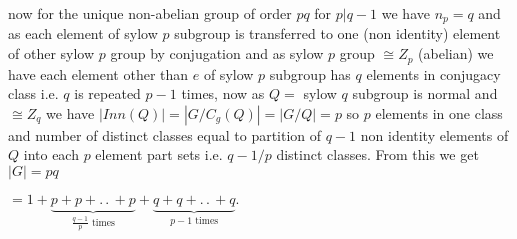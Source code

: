 \documentclass[11pt]{extarticle}
\newcommand{\w}[1]{\text{#1}}
\newcommand{\ck}{.\,.\,}
\newcommand{\tbx}[2][]{
	\begin{tcolorbox}[enhanced,breakable,size=small,colback=black!2!white,title={#1},arc is angular, arc=1.5mm,drop fuzzy shadow]
		#2
	\end{tcolorbox}
}
\begin{document}
\begin{multicols}{2}
	\tbx[\small Class equation of non abelian $pq $ order group]{ now for the unique non-abelian group of order $ pq $ for $ p|q-1 $ we have $ n_p=q$ and as each element of sylow $ p $ subgroup is transferred to one (non identity) element of other sylow $ p $ group by conjugation and as sylow $ p $ group $ \cong Z_p$ (abelian) we have each element other than $ e $ of sylow $ p $ subgroup has  $ q $ elements in conjugacy class i.e. $ q $ is repeated $ p-1 $ times, now as  $ Q= $ sylow $ q $ subgroup is normal and $ \cong Z_q $ we have $ |Inn(Q)|=|G/C_g(Q)|=|G/Q|=p $ so $ p $ elements in one class and number of distinct classes equal to partition of $ q-1 $ non identity elements of $ Q $ into each $ p $ element part sets i.e. $ q-1/p $  distinct classes. From this we get \\
		$ |G|=pq$
		\begin{center}
			$=1+\underbrace{p+p+\ck +p}_{\frac{ q-1 }{p}\w{ times}}+\underbrace{q+q+\ck+q}_{p-1 \w{ times}} .$
	\end{center}  }
	

\end{multicols}
\end{document}
